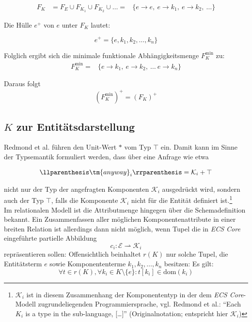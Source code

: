 \[
    \begin{alignat}{3}
         F_{K} &= F_E \cup F_{K_1} \cup F_{K_2} \cup \ldots =
            &\{e \rightarrow e,\ e \rightarrow k_1, \ e \rightarrow k_2, \ \ldots\}
    \end{alignat}
\]
\medskip

\noindent
Die Hülle $e^+$ von $e$ unter $F_{K}$ lautet:

\[
    e^+ =\{e, k_1, k_2, \ldots, k_n\}
\]

\noindent
Folglich ergibt sich die minimale funktionale Abhängigkeitsmenge $F^\text{min}_{K}$ zu:
\[
    \begin{alignat}{3}
        F^\text{min}_{K} = &\{e \rightarrow {k_1},\ e \rightarrow {k_2}, \ \ldots \ e \rightarrow {k_n}  \}
    \end{alignat}
\]

\noindent
Daraus folgt
\[
    \begin{alignat}{3}
        (F^\text{min}_{K})^+ = (F_{K})^+
    \end{alignat}
\]


\subsection*{$K$ zur Entitätsdarstellung}

Redmond et al. führen den Unit-Wert $*$ vom Typ $\top$ ein.
Damit kann im Sinne der Typsemantik formuliert werden, dass über eine Anfrage wie etwa

\[
    \llparenthesis \tm{anyway}_i \rrparenthesis = \mathcal{K}_i + \top
\]

\noindent
nicht nur der Typ der angefragten Komponenten $\mathcal{K}_i$ ausgedrückt wird, sondern auch der Typ $\top$, falls die Komponente $\mathcal{K}_i$ nicht für die Entität definiert ist.\footnote{$\mathcal{K}_i$ ist in diesem Zusammenhang der Komponententyp in der dem \textit{ECS Core}-Modell zugrundeliegenden Programmiersprache, vgl. Redmond et al.: ``Each $K_i$ is a type in the sub-language, [\dots]'' (Originalnotation; entspricht hier $\mathcal{K}_i$)}\\

Im relationalen Modell ist die Attributmenge hingegen über die Schemadefinition bekannt.
Ein Zusammenfassen aller möglichen Komponentenattribute in einer breiten Relation ist allerdings dann nicht möglich, wenn Tupel die in \textit{ECS Core} eingeführte partielle Abbildung
\[
    c_i : \mathcal{E} \rightharpoonup \mathcal{K}_i
\]
repräsentieren sollen: Offensichtlich beinhaltet $r(K)$ nur solche Tupel, die Entitätsterm $e$ sowie Komponententerme $k_1, k_2, \ldots , k_n$ besitzen:
Es gilt:
\[
    \forall t \in r(K),\forall k_i \in K \setminus \{e\}: t[k_i] \in \text{dom}(k_i)
\]
\smallskip

